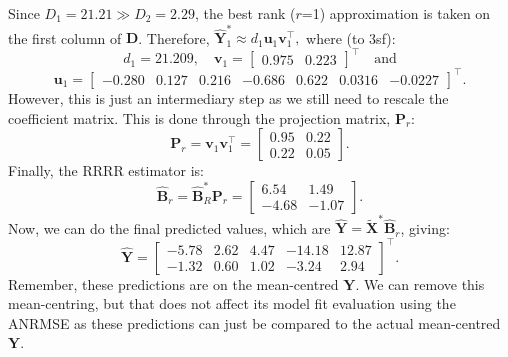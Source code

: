 \documentclass[11pt]{report} %
\begin{document}
Since \( D_1 = 21.21 \gg D_2 = 2.29 \), the best rank ($r$=1) approximation is taken on the first column of $\mathbf{D}$. Therefore, $\hat{\mathbf{Y}}^*_1 \approx d_1 \mathbf{u}_1 \mathbf{v}_1^\top,$
where (to 3sf):
\[
d_1 = 21.209, \quad 
\mathbf{v}_1 =
\begin{bmatrix}
0.975 & 0.223
\end{bmatrix}^\top \quad \text{and}
\]
\vspace{-0.3cm}
\[
\mathbf{u}_1 =
\begin{bmatrix}
-0.280 & 0.127 & 0.216 & -0.686 & 0.622 & 0.0316 & -0.0227
\end{bmatrix}^\top.
\]
However, this is just an intermediary step as we still need to rescale the coefficient matrix. This is done through the projection matrix, $\mathbf{P}_r$:
\[
\mathbf{P}_r =\mathbf{v}_1 \mathbf{v}_1^\top
 =
\begin{bmatrix}
0.95 & 0.22 \\
0.22 & 0.05
\end{bmatrix}.
\]
Finally, the RRRR estimator is:
\vspace{-0.3cm}
\[
\hat{\mathbf{B}}_r=
 \hat{\mathbf{B}}^*_R \mathbf{P}_r
 =
\begin{bmatrix}
6.54 & 1.49 \\
-4.68 & -1.07
\end{bmatrix}.
\]
Now, we can do the final predicted values, which are $\mathbf{\hat{Y}}=\mathbf{\tilde{X}^*\hat{B}}_r$, giving:
\[
\mathbf{\hat{Y}}=
\begin{bmatrix}
-5.78 & 2.62 & 4.47 & -14.18 & 12.87 \\
-1.32 & 0.60 & 1.02 & -3.24 & 2.94
\end{bmatrix}^{\top}.
\]
Remember, these predictions are on the mean-centred $\mathbf{Y}$.
We can remove this mean-centring, but that does not affect its model fit evaluation using the ANRMSE as these predictions can just be compared to the actual mean-centred $\mathbf{Y}$.
\vspace{-0.3cm}
\end{document}
